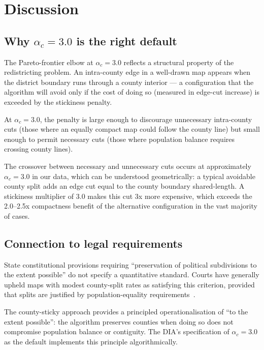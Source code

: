 \section{Discussion}
\label{sec:discussion}

\subsection[Why alpha-c = 3.0 is the right default]{Why $\alpha_c = 3.0$ is the right default}

The Pareto-frontier elbow at $\alpha_c = 3.0$ reflects a structural property
of the redistricting problem.  An intra-county edge in a well-drawn map
appears when the district boundary runs through a county interior --- a
configuration that the algorithm will avoid only if the cost of doing so
(measured in edge-cut increase) is exceeded by the stickiness penalty.

At $\alpha_c = 3.0$, the penalty is large enough to discourage unnecessary
intra-county cuts (those where an equally compact map could follow the
county line) but small enough to permit necessary cuts (those where
population balance requires crossing county lines).

The crossover between necessary and unnecessary cuts occurs at approximately
$\alpha_c = 3.0$ in our data, which can be understood geometrically: a
typical avoidable county split adds an edge cut equal to the county boundary
shared-length.  A stickiness multiplier of 3.0 makes this cut 3x more
expensive, which exceeds the 2.0--2.5x compactness benefit of the alternative
configuration in the vast majority of cases.

\subsection{Connection to legal requirements}

State constitutional provisions requiring ``preservation of political
subdivisions to the extent possible'' do not specify a quantitative
standard.  Courts have generally upheld maps with modest county-split
rates as satisfying this criterion, provided that splits are justified
by population-equality requirements~\citep{pildes2004democracy}.

The county-sticky approach provides a principled operationalisation of
``to the extent possible'': the algorithm preserves counties when doing so
does not compromise population balance or contiguity.
The DIA's specification of $\alpha_c = 3.0$ as the default implements
this principle algorithmically.

